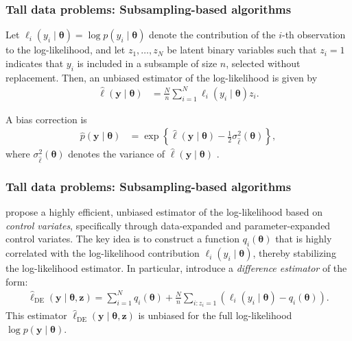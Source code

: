 \documentclass[12pt, compress]{beamer}
\begin{document}
\begin{frame}
	\frametitle{Tall data problems: Subsampling-based algorithms}
Let \( \ell_i(y_i \mid \boldsymbol{\theta}) = \log p(y_i \mid \boldsymbol{\theta}) \) denote the contribution of the \( i \)-th observation to the log-likelihood, and let \( z_1, \dots, z_N \) be latent binary variables such that \( z_i = 1 \) indicates that \( y_i \) is included in a subsample of size \( n \), selected without replacement. Then, an unbiased estimator of the log-likelihood is given by
\begin{align*}
	\hat{\ell}(\mathbf{y} \mid \boldsymbol{\theta}) & = \frac{N}{n} \sum_{i=1}^N \ell_i(y_i \mid \boldsymbol{\theta}) z_i.
\end{align*}

A bias correction is
\begin{align*}
	\hat{p}(\mathbf{y} \mid \boldsymbol{\theta}) & = \exp\left\{ \hat{\ell}(\mathbf{y} \mid \boldsymbol{\theta}) - \frac{1}{2} \sigma^2_{\hat{\ell}}(\boldsymbol{\theta}) \right\},
\end{align*}
where \( \sigma^2_{\hat{\ell}}(\boldsymbol{\theta}) \) denotes the variance of \( \hat{\ell}(\mathbf{y} \mid \boldsymbol{\theta}) \) \citep{ceperley1999penalty}.
\end{frame}

\begin{frame}
	\frametitle{Tall data problems: Subsampling-based algorithms}
\cite{quiroz2019speeding} propose a highly efficient, unbiased estimator of the log-likelihood based on \textit{control variates}, specifically through data-expanded and parameter-expanded control variates. 
The key idea is to construct a function \( q_i(\boldsymbol{\theta}) \) that is highly correlated with the log-likelihood contribution \( \ell_i(y_i \mid \boldsymbol{\theta}) \), thereby stabilizing the log-likelihood estimator. In particular, \cite{quiroz2019speeding} introduce a \textit{difference estimator} of the form:
\begin{align*}
	\hat{\ell}_{\mathrm{DE}}(\mathbf{y} \mid \boldsymbol{\theta}, \mathbf{z}) = \sum_{i=1}^N q_i(\boldsymbol{\theta}) + \frac{N}{n} \sum_{i: z_i = 1} \left( \ell_i(y_i \mid \boldsymbol{\theta}) - q_i(\boldsymbol{\theta}) \right).
\end{align*}
This estimator \( \hat{\ell}_{\mathrm{DE}}(\mathbf{y} \mid \boldsymbol{\theta}, \mathbf{z}) \) is unbiased for the full log-likelihood \( \log p(\mathbf{y} \mid \boldsymbol{\theta}) \).

\end{frame}
\end{document}
